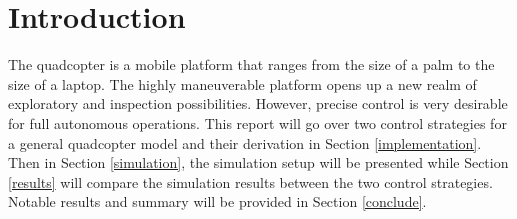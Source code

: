 \documentclass[conference]{IEEEtran}
\begin{document}
\section{Introduction}
The quadcopter is a mobile platform that ranges from the size of a palm to the size of a laptop. The highly maneuverable platform opens up a new realm of exploratory and inspection possibilities. However, precise control is very desirable for full autonomous operations. This report will go over two control strategies for a general quadcopter model and their derivation in Section \ref{implementation}. Then in Section \ref{simulation}, the simulation setup will be presented while Section \ref{results} will compare the simulation results between the two control strategies. Notable results and summary will be provided in Section \ref{conclude}.
\end{document}
